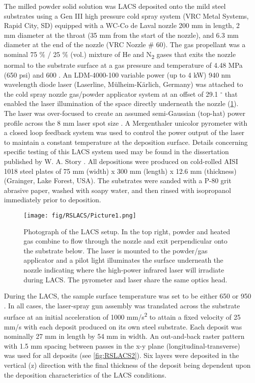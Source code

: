 		
		The milled powder solid solution \cite{RN243} was LACS deposited onto the mild steel substrates using a Gen III high pressure cold spray system (VRC Metal Systems, Rapid City, SD) equipped with a WC-Co de Laval nozzle 200 mm in length, 2 mm diameter at the throat (35 mm from the start of the nozzle), and 6.3 mm diameter at the end of the nozzle (VRC Nozzle $\#$ 60). The gas propellant was a nominal 75 $\%$ / 25 $\%$  (vol.) mixture of He and N\textsubscript{2 }gases that exits the nozzle normal to the substrate surface at a gas pressure and temperature of 4.48 MPa (650 psi) and 600 \celsius{}. An LDM-4000-100 variable power (up to 4 kW) 940 nm wavelength diode laser (Laserline, Mülheim-Kärlich, Germany) was attached to the cold spray nozzle gas/powder applicator system at an offset of 29.1 $ ^{\circ} $  that enabled the laser illumination of the space directly underneath the nozzle (\ref{fig:RSLACS1}). The laser was  over-focused to create an assumed semi-Gaussian (top-hat) power profile across the 8 mm laser spot size \cite{RN828}. A Mergenthaler unicolor pyrometer with a closed loop feedback system was used to control the power output of the laser to maintain a constant temperature at the deposition surface. Details concerning specific testing of this LACS system used may be found in the dissertation published by W. A. Story \cite{RN720}. All depositions were produced on cold-rolled AISI 1018 steel plates of 75 mm (width) x 300 mm (length) x 12.6 mm (thickness) (Grainger, Lake Forest, USA). The substrates were sanded with a P-80 grit abrasive paper, washed with soapy water, and then rinsed with isopropanol immediately prior to deposition.
		
		
		\begin{figure}
			\centering
			\texttt{[image: fig/RSLACS/Picture1.png]}
			\caption[Photograph of the LACS setup.]{Photograph of the LACS setup. In the top right, powder and heated gas combine to flow through the nozzle and exit perpendicular onto the substrate below. The laser is mounted to the powder/gas applicator and a pilot light illuminates the surface underneath the nozzle indicating where the high-power infrared laser will irradiate during LACS. The pyrometer and laser share the same optics head.}
			\label{fig:RSLACS1}
		\end{figure}

		
		
		During the LACS, the sample surface temperature was set to be either 650 \celsius{} or 950 \celsius{}. In all cases, the laser-spray gun assembly was translated across the substrate surface at an initial acceleration of 1000 mm/s\textsuperscript{2} to attain a fixed velocity of 25 mm/s with each deposit produced on its own steel substrate. Each deposit was nominally 27 mm in length by 54 mm in width. An out-and-back raster pattern with 1.5 mm spacing between passes in the x-y plane (longitudinal-transverse) was used for all deposits (see \ref{fig:RSLACS2}). Six layers were deposited in the vertical (z) direction with the final thickness of the deposit being dependent upon the deposition characteristics of the LACS conditions.
		
